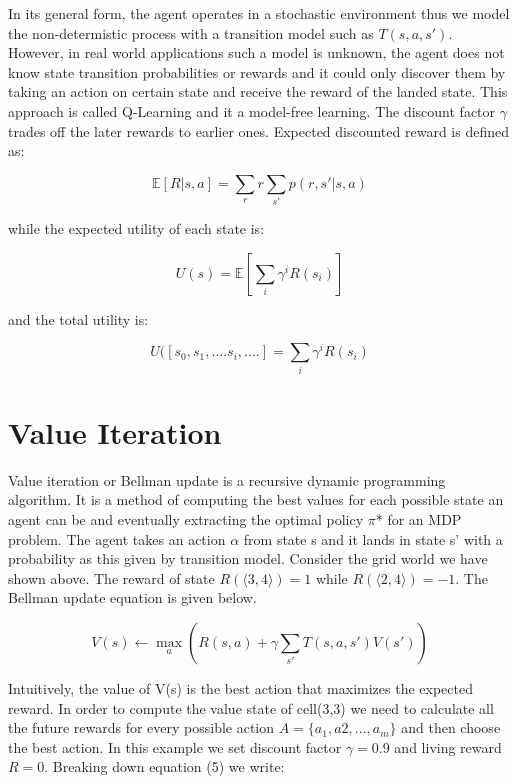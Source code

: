 \documentclass[10pt,a4paper,twocolumn]{article}
\begin{document}
	In its general form, the agent operates in a stochastic environment thus we model the non-determistic process with a transition model such as $T(s,a,s')$. However, in real world applications such a model is unknown, the agent does not know state transition probabilities or rewards and it could only discover them by taking an action on certain state and receive the reward of the landed state. This approach is called Q-Learning and it a model-free learning. The discount factor $\gamma$ trades off the later rewards to earlier ones. Expected discounted reward is defined as:
	
	\begin{equation}
		\mathbb{E}[R | s,a] = \sum_{r}r \sum_{s'}p(r, s' | s, a)
	\end{equation}
	
	while the expected utility of each state is:
	
	\begin{equation}
		U(s) = \mathbb{E}[ \sum_{i}\gamma^{i}R(s_{i})]
	\end{equation}
	
	
	and the total utility is:
	
	\begin{equation}
		U([s_{0}, s_{1}, .... s_{i}, ....] = \sum_{i}\gamma^{i}R(s_{i})
	\end{equation}
	
	\section{Value Iteration}
	Value iteration or Bellman update is a recursive dynamic programming algorithm. It is a method of computing the best values for each possible state an agent can be and eventually extracting the optimal policy $\pi$* for an MDP problem. The agent takes an action $\alpha$ from state s and it lands in state s’ with a probability as this given by transition model. Consider the grid world we have shown above. The reward of state $R(\big \langle 3,4 \big \rangle) = 1$ while $R(\big \langle 2,4 \big \rangle) = -1$. The Bellman update equation is given below.
	
	\begin{equation}
		V(s) \leftarrow \max_{a} { ( R(s,a) + \gamma \sum_{s'}T(s,a,s')V(s') )}
	\end{equation}
	
	Intuitively, the value of V(s) is the best action that maximizes the expected reward. In order to compute the value state of cell(3,3) we need to calculate all the  future rewards for every possible action $A = \{ a_{1}, a{2}, ..., a_{m} \}$ and then choose the best action. In this example we set discount factor $\gamma = 0.9$ and living reward $R=0$. Breaking down equation (5) we write:
	
\end{document}
